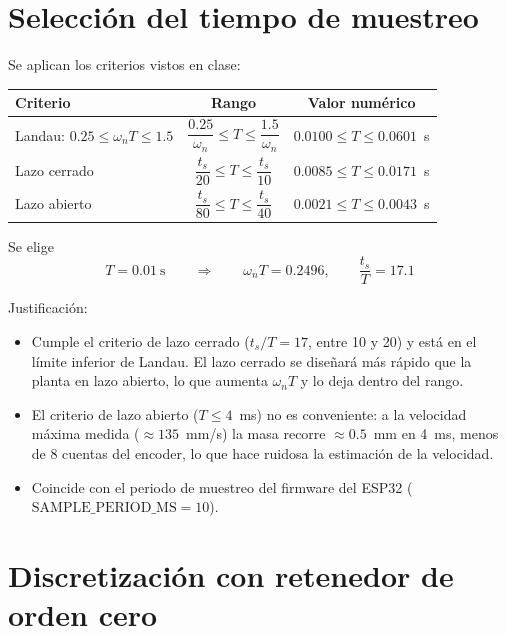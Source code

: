 \documentclass[11pt,letterpaper]{article}
\begin{document}
\section{Selección del tiempo de muestreo}

Se aplican los criterios vistos en clase:

\begin{table}[H]
\centering
\begin{tabular}{lcc}
\toprule
Criterio & Rango & Valor numérico \\
\midrule
Landau: $0.25 \le \omega_n T \le 1.5$ & $\dfrac{0.25}{\omega_n} \le T \le \dfrac{1.5}{\omega_n}$ & $0.0100 \le T \le 0.0601$~s\\[8pt]
Lazo cerrado & $\dfrac{t_s}{20} \le T \le \dfrac{t_s}{10}$ & $0.0085 \le T \le 0.0171$~s\\[8pt]
Lazo abierto & $\dfrac{t_s}{80} \le T \le \dfrac{t_s}{40}$ & $0.0021 \le T \le 0.0043$~s\\
\bottomrule
\end{tabular}
\end{table}

Se elige
\begin{equation}
  \boxed{T = 0.01~\text{s}}
  \qquad\Rightarrow\qquad
  \omega_n T = 0.2496,\qquad \frac{t_s}{T} = 17.1
\end{equation}

Justificación:
\begin{itemize}
  \item Cumple el criterio de lazo cerrado ($t_s/T = 17$, entre 10 y 20) y
        está en el límite inferior de Landau. El lazo cerrado se diseñará más
        rápido que la planta en lazo abierto, lo que aumenta $\omega_n T$ y lo
        deja dentro del rango.
  \item El criterio de lazo abierto ($T\le 4$~ms) no es conveniente: a la
        velocidad máxima medida ($\approx 135$~mm/s) la masa recorre
        $\approx 0.5$~mm en 4~ms, menos de 8 cuentas del encoder, lo que hace
        ruidosa la estimación de la velocidad.
  \item Coincide con el periodo de muestreo del firmware del ESP32
        ($\text{SAMPLE\_PERIOD\_MS}=10$).
\end{itemize}

\section{Discretización con retenedor de orden cero}
\end{document}
